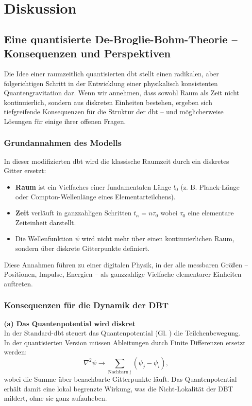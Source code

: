 \chapter{Diskussion}
\section{Eine quantisierte De-Broglie-Bohm-Theorie – Konsequenzen und Perspektiven}
Die Idee einer raumzeitlich quantisierten \gls{dbt} stellt einen radikalen, aber folgerichtigen Schritt in der Entwicklung einer physikalisch konsistenten Quantengravitation dar.
Wenn wir annehmen, dass sowohl Raum als Zeit nicht kontinuierlich, sondern aus diskreten Einheiten bestehen, ergeben sich tiefgreifende Konsequenzen für die Struktur der \gls{dbt} – und
möglicherweise Lösungen für einige ihrer offenen Fragen.

\subsection{Grundannahmen des Modells}
In dieser modifizierten \gls{dbt} wird die klassische Raumzeit durch ein diskretes Gitter ersetzt:
\begin{itemize}
    \item \textbf{Raum} ist ein Vielfaches einer fundamentalen Länge $l_0$ (z. B. Planck-Länge oder Compton-Wellenlänge eines Elementarteilchens).
    \item \textbf{Zeit} verläuft in ganzzahligen Schritten $t_n = n\tau_0$ wobei $\tau_0$ eine elementare Zeiteinheit darstellt.
    \item Die Wellenfunktion $\psi$ wird nicht mehr über einen kontinuierlichen Raum, sondern über diskrete Gitterpunkte definiert.
\end{itemize}
Diese Annahmen führen zu einer digitalen Physik, in der alle messbaren Größen – Positionen, Impulse, Energien – als ganzzahlige Vielfache elementarer Einheiten auftreten.

\subsection{Konsequenzen für die Dynamik der DBT}
\textbf{(a) Das Quantenpotential wird diskret}\\
In der Standard-\gls{dbt} steuert das Quantenpotential (Gl. ) die Teilchenbewegung. In der quantisierten Version müssen Ableitungen durch Finite
Differenzen ersetzt werden:
\begin{equation}
    \nabla^{2} \psi \to \sum_\text{Nachbarn j} \left( \psi_j - \psi_i \right),
\end{equation}
wobei die Summe über benachbarte Gitterpunkte läuft. Das Quantenpotential erhält damit eine lokal begrenzte Wirkung, was die Nicht-Lokalität der DBT mildert, ohne sie ganz aufzuheben.


